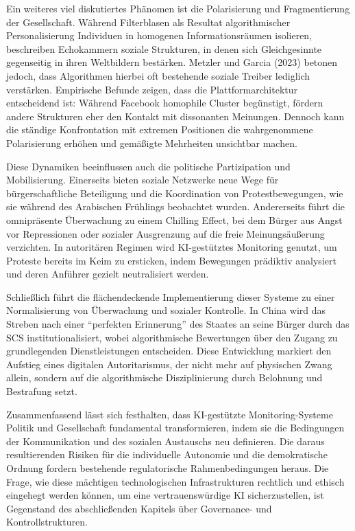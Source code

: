 Ein weiteres viel diskutiertes Phänomen ist die Polarisierung und Fragmentierung der Gesellschaft. Während Filterblasen als Resultat algorithmischer Personalisierung Individuen in homogenen Informationsräumen isolieren, beschreiben Echokammern soziale Strukturen, in denen sich Gleichgesinnte gegenseitig in ihren Weltbildern bestärken. Metzler und Garcia (2023) betonen jedoch, dass Algorithmen hierbei oft bestehende soziale Treiber lediglich verstärken. Empirische Befunde zeigen, dass die Plattformarchitektur entscheidend ist: Während Facebook homophile Cluster begünstigt, fördern andere Strukturen eher den Kontakt mit dissonanten Meinungen. Dennoch kann die ständige Konfrontation mit extremen Positionen die wahrgenommene Polarisierung erhöhen und gemäßigte Mehrheiten unsichtbar machen.

Diese Dynamiken beeinflussen auch die politische Partizipation und Mobilisierung. Einerseits bieten soziale Netzwerke neue Wege für bürgerschaftliche Beteiligung und die Koordination von Protestbewegungen, wie sie während des Arabischen Frühlings beobachtet wurden. Andererseits führt die omnipräsente Überwachung zu einem Chilling Effect, bei dem Bürger aus Angst vor Repressionen oder sozialer Ausgrenzung auf die freie Meinungsäußerung verzichten. In autoritären Regimen wird \ac{KI}-gestütztes Monitoring genutzt, um Proteste bereits im Keim zu ersticken, indem Bewegungen prädiktiv analysiert und deren Anführer gezielt neutralisiert werden.

Schließlich führt die flächendeckende Implementierung dieser Systeme zu einer Normalisierung von Überwachung und sozialer Kontrolle. In China wird das Streben nach einer \enquote{perfekten Erinnerung} des Staates an seine Bürger durch das \ac{SCS} institutionalisiert, wobei algorithmische Bewertungen über den Zugang zu grundlegenden Dienstleistungen entscheiden. Diese Entwicklung markiert den Aufstieg eines digitalen Autoritarismus, der nicht mehr auf physischen Zwang allein, sondern auf die algorithmische Disziplinierung durch Belohnung und Bestrafung setzt.

Zusammenfassend lässt sich festhalten, dass \ac{KI}-gestützte Monitoring-Systeme Politik und Gesellschaft fundamental transformieren, indem sie die Bedingungen der Kommunikation und des sozialen Austauschs neu definieren. Die daraus resultierenden Risiken für die individuelle Autonomie und die demokratische Ordnung fordern bestehende regulatorische Rahmenbedingungen heraus. Die Frage, wie diese mächtigen technologischen Infrastrukturen rechtlich und ethisch eingehegt werden können, um eine vertrauenswürdige \ac{KI} sicherzustellen, ist Gegenstand des abschließenden Kapitels über Governance- und Kontrollstrukturen.
